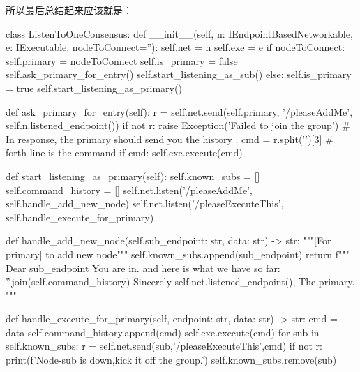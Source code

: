\documentclass[dvipsnames]{ctexart}
\begin{document}
所以最后总结起来应该就是：
\begin{simplepy}
class ListenToOneConsensus:
    def __init__(self,
                 n: IEndpointBasedNetworkable,
                 e: IExecutable,
                 nodeToConnect=''):
        self.net = n
        self.exe = e
        if nodeToConnect:
            self.primary = nodeToConnect
            self.is_primary = false
            self.ask_primary_for_entry()
            self.start_listening_as_sub()
        else:
            self.is_primary = true
            self.start_listening_as_primary()

    def ask_primary_for_entry(self):
        r = self.net.send(self.primary,
                    '/pleaseAddMe',
                    self.n.listened_endpoint())
        if not r:
            raise Exception('Failed to join the group')
        # In response, the primary should send you the history .
        cmd = r.split('\n')[3]  # forth line is the command
        if cmd:
            self.exe.execute(cmd)

    def start_listening_as_primary(self):
        self.known_subs = []
        self.command_history = []
        self.net.listen('/pleaseAddMe',
                        self.handle_add_new_node)
        self.net.listen('/pleaseExecuteThis',
                        self.handle_execute_for_primary)

    def handle_add_new_node(self,sub_endpoint: str,
                            data: str) -> str:
        """[For primary] to add new node"""
        self.known_subs.append(sub_endpoint)
        return f"""
        Dear {sub_endpoint}
            You are in. and here is what we have so far:
            {''.join(self.command_history)}
                   Sincerely
                   {self.net.listened_endpoint()}, The primary.
        """

    def handle_execute_for_primary(self, endpoint: str,
                                   data: str) -> str:
        cmd = data
        self.command_history.append(cmd)
        self.exe.execute(cmd)
        for sub in self.known_subs:
            r = self.net.send(sub,'/pleaseExecuteThis',cmd)
            if not r:
                print(f'Node-{sub} is down,kick it off the group.')
                self.known_subs.remove(sub)


\end{simplepy}
\end{document}

